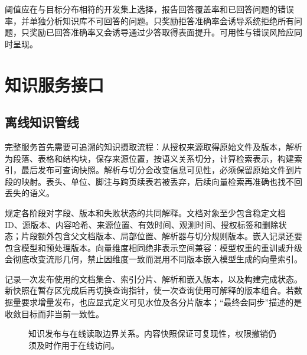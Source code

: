 \documentclass[../textbook.tex]{subfiles}
\begin{document}
阈值应在与目标分布相符的开发集上选择，报告回答覆盖率和已回答问题的错误率，并单独分析知识库不可回答的问题。只奖励拒答准确率会诱导系统拒绝所有问题，只奖励已回答准确率又会诱导通过少答取得表面提升。可用性与错误风险应同时呈现。

\section{知识服务接口}

\subsection{离线知识管线}
完整服务首先需要可追溯的知识摄取流程：从授权来源取得原始文件及版本，解析为段落、表格和结构块，保存来源位置，按语义关系切分，计算检索表示，构建索引，最后发布可查询快照。解析与切分会改变信息可见性，必须保留原始文件到片段的映射。表头、单位、脚注与跨页续表若被丢弃，后续向量检索再准确也找不回丢失的语义。

规定各阶段对字段、版本和失败状态的共同解释。文档对象至少包含稳定文档 ID、源版本、内容哈希、来源位置、有效时间、观测时间、授权标签和删除状态；片段额外包含父文档版本、局部位置、解析器与切分规则版本。嵌入记录还要包含模型和预处理版本。向量维度相同绝非表示空间兼容：模型权重的重训或升级会彻底改变流形几何，禁止因维度一致而混用不同版本嵌入模型生成的向量索引。

记录一次发布使用的文档集合、索引分片、解析和嵌入版本，以及构建完成状态。新快照在暂存区完成后再切换查询指针，使一次查询使用可解释的版本组合。若数据量要求增量发布，也应显式定义可见水位及各分片版本；“最终会同步”描述的是收敛目标而非当前一致性。

\begin{figure}[htbp]
\centering
{}
\caption[知识发布与在线读取边界关系]{知识发布与在线读取边界关系。内容快照保证可复现性，权限撤销仍须及时作用于在线访问。}\label{fig:rag-ingestion}
\end{figure}
\end{document}
